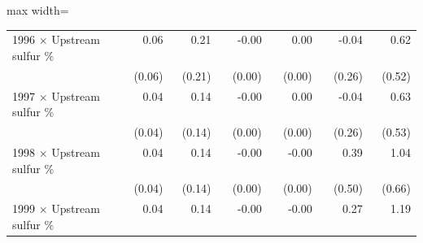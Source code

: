 \begin{table}[htbp]
{\begin{adjustbox}{max width=\linewidth}
\begin{tabular}{lrrrrrr}
1996 $\times$ Upstream sulfur \% & \phantom{(}\phantom{-}0.06$^{\phantom{*}\phantom{*}\phantom{*}}$ & \phantom{(}\phantom{-}0.21$^{\phantom{*}\phantom{*}\phantom{*}}$ & \phantom{(}-0.00$^{\phantom{*}\phantom{*}\phantom{*}}$ & \phantom{(}\phantom{-}0.00$^{\phantom{*}\phantom{*}\phantom{*}}$ & \phantom{(}-0.04$^{\phantom{*}\phantom{*}\phantom{*}}$ & \phantom{(}\phantom{-}0.62$^{\phantom{*}\phantom{*}\phantom{*}}$ \\
 & (\phantom{-}0.06)\phantom{$^{***}$} & (\phantom{-}0.21)\phantom{$^{***}$} & (\phantom{-}0.00)\phantom{$^{***}$} & (\phantom{-}0.00)\phantom{$^{***}$} & (\phantom{-}0.26)\phantom{$^{***}$} & (\phantom{-}0.52)\phantom{$^{***}$} \\
1997 $\times$ Upstream sulfur \% & \phantom{(}\phantom{-}0.04$^{\phantom{*}\phantom{*}\phantom{*}}$ & \phantom{(}\phantom{-}0.14$^{\phantom{*}\phantom{*}\phantom{*}}$ & \phantom{(}-0.00$^{\phantom{*}\phantom{*}\phantom{*}}$ & \phantom{(}\phantom{-}0.00$^{\phantom{*}\phantom{*}\phantom{*}}$ & \phantom{(}-0.04$^{\phantom{*}\phantom{*}\phantom{*}}$ & \phantom{(}\phantom{-}0.63$^{\phantom{*}\phantom{*}\phantom{*}}$ \\
 & (\phantom{-}0.04)\phantom{$^{***}$} & (\phantom{-}0.14)\phantom{$^{***}$} & (\phantom{-}0.00)\phantom{$^{***}$} & (\phantom{-}0.00)\phantom{$^{***}$} & (\phantom{-}0.26)\phantom{$^{***}$} & (\phantom{-}0.53)\phantom{$^{***}$} \\
1998 $\times$ Upstream sulfur \% & \phantom{(}\phantom{-}0.04$^{\phantom{*}\phantom{*}\phantom{*}}$ & \phantom{(}\phantom{-}0.14$^{\phantom{*}\phantom{*}\phantom{*}}$ & \phantom{(}-0.00$^{\phantom{*}\phantom{*}\phantom{*}}$ & \phantom{(}-0.00$^{\phantom{*}\phantom{*}\phantom{*}}$ & \phantom{(}\phantom{-}0.39$^{\phantom{*}\phantom{*}\phantom{*}}$ & \phantom{(}\phantom{-}1.04$^{\phantom{*}\phantom{*}\phantom{*}}$ \\
 & (\phantom{-}0.04)\phantom{$^{***}$} & (\phantom{-}0.14)\phantom{$^{***}$} & (\phantom{-}0.00)\phantom{$^{***}$} & (\phantom{-}0.00)\phantom{$^{***}$} & (\phantom{-}0.50)\phantom{$^{***}$} & (\phantom{-}0.66)\phantom{$^{***}$} \\
1999 $\times$ Upstream sulfur \% & \phantom{(}\phantom{-}0.04$^{\phantom{*}\phantom{*}\phantom{*}}$ & \phantom{(}\phantom{-}0.14$^{\phantom{*}\phantom{*}\phantom{*}}$ & \phantom{(}-0.00$^{\phantom{*}\phantom{*}\phantom{*}}$ & \phantom{(}-0.00$^{\phantom{*}\phantom{*}\phantom{*}}$ & \phantom{(}\phantom{-}0.27$^{\phantom{*}\phantom{*}\phantom{*}}$ & \phantom{(}\phantom{-}1.19$^{\phantom{*}\phantom{*}\phantom{*}}$ \\

\end{tabular}
\end{adjustbox}}
\end{table}
